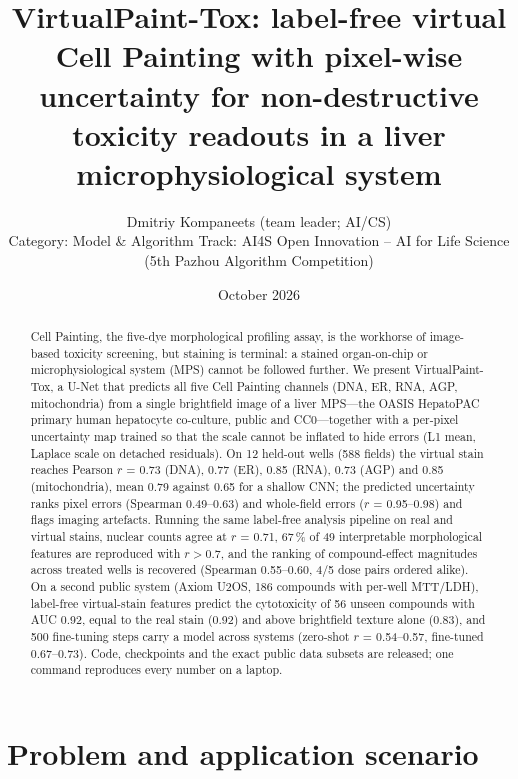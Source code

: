 \documentclass[11pt,a4paper]{article}
\title{\textbf{VirtualPaint-Tox}: label-free virtual Cell Painting with pixel-wise uncertainty for non-destructive toxicity readouts in a liver microphysiological system}
\author{Dmitriy Kompaneets (team leader; AI/CS) \\ \small Category: Model \& Algorithm \quad Track: AI4S Open Innovation -- AI for Life Science (5th Pazhou Algorithm Competition)}
\date{October 2026}
\begin{document}
\maketitle

\begin{abstract}
Cell Painting, the five-dye morphological profiling assay, is the workhorse of image-based toxicity screening, but staining is terminal: a stained organ-on-chip or microphysiological system (MPS) cannot be followed further. We present VirtualPaint-Tox, a U-Net that predicts all five Cell Painting channels (DNA, ER, RNA, AGP, mitochondria) from a single brightfield image of a liver MPS---the OASIS HepatoPAC primary human hepatocyte co-culture, public and CC0---together with a per-pixel uncertainty map trained so that the scale cannot be inflated to hide errors (L1 mean, Laplace scale on detached residuals). On 12 held-out wells (588 fields) the virtual stain reaches Pearson $r$ = 0.73 (DNA), 0.77 (ER), 0.85 (RNA), 0.73 (AGP) and 0.85 (mitochondria), mean 0.79 against 0.65 for a shallow CNN; the predicted uncertainty ranks pixel errors (Spearman 0.49--0.63) and whole-field errors ($r$ = 0.95--0.98) and flags imaging artefacts. Running the same label-free analysis pipeline on real and virtual stains, nuclear counts agree at $r$ = 0.71, 67\,\% of 49 interpretable morphological features are reproduced with $r > 0.7$, and the ranking of compound-effect magnitudes across treated wells is recovered (Spearman 0.55--0.60, 4/5 dose pairs ordered alike). On a second public system (Axiom U2OS, 186 compounds with per-well MTT/LDH), label-free virtual-stain features predict the cytotoxicity of 56 unseen compounds with AUC 0.92, equal to the real stain (0.92) and above brightfield texture alone (0.83), and 500 fine-tuning steps carry a model across systems (zero-shot $r$ = 0.54--0.57, fine-tuned 0.67--0.73). Code, checkpoints and the exact public data subsets are released; one command reproduces every number on a laptop.
\end{abstract}

\section{Problem and application scenario}
\label{sec:problem}
\end{document}
